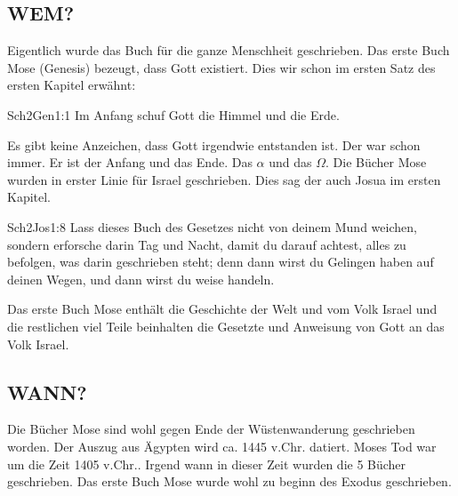 \subsection{WEM?}
Eigentlich wurde das Buch für die ganze Menschheit geschrieben. Das erste Buch Mose (Genesis) bezeugt, dass Gott existiert. Dies wir schon im ersten Satz des ersten Kapitel erwähnt:
\begin{bibeltext}{Sch2}{Gen}{1:1}
    Im Anfang schuf Gott die Himmel und die Erde.
\end{bibeltext}
Es gibt keine Anzeichen, dass Gott irgendwie entstanden ist. Der \herr{} war schon immer. Er ist der Anfang und das Ende. Das $\alpha$ und das $\Omega$.
Die Bücher Mose wurden in erster Linie für Israel geschrieben. Dies sag der \herr{} auch Josua im ersten Kapitel.
\begin{bibeltext}{Sch2}{Jos}{1:8}
   Lass dieses Buch des Gesetzes nicht von deinem Mund weichen, sondern erforsche darin Tag und Nacht, damit du darauf achtest, alles zu befolgen, was darin geschrieben steht; denn dann wirst du Gelingen haben auf deinen Wegen, und dann wirst du weise handeln. 
\end{bibeltext}
Das erste Buch Mose enthält die Geschichte der Welt und vom Volk Israel und die restlichen viel Teile beinhalten die Gesetzte und Anweisung von Gott an das Volk Israel.
\subsection{WANN?}
Die Bücher Mose sind wohl gegen Ende der Wüstenwanderung geschrieben worden. Der Auszug aus Ägypten wird ca. 1445 v.Chr. datiert. Moses Tod war um die Zeit 1405 v.Chr.. Irgend wann in dieser Zeit wurden die 5 Bücher geschrieben. Das erste Buch Mose wurde wohl zu beginn des Exodus geschrieben.

